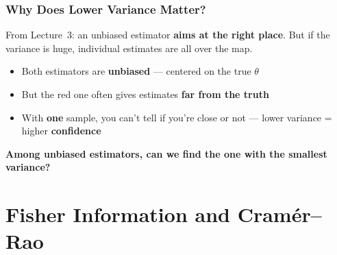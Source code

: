 \documentclass[aspectratio=169]{beamer}
\begin{document}
\begin{frame}
\frametitle{Why Does Lower Variance Matter?}

\small
From Lecture~3: an unbiased estimator \textbf{aims at the right place}. But if the variance is huge, individual estimates are all over the map.

\vspace{0.05cm}
\begin{center}
\end{center}

\vspace{-0.1cm}
\pause
\begin{itemize}\setlength{\itemsep}{1pt}
  \item Both estimators are \textbf{unbiased} --- centered on the true $\theta$
  \item But the \textcolor{sampred}{red one} often gives estimates \textbf{far from the truth}
  \item With \textbf{one} sample, you can't tell if you're close or not --- lower variance = higher \textbf{confidence}
\end{itemize}

\vspace{0.05cm}
\centering\textbf{Among unbiased estimators, can we find the one with the \textbf{smallest} variance?}
\end{frame}

\section{Fisher Information and Cram\'er--Rao}
\end{document}
